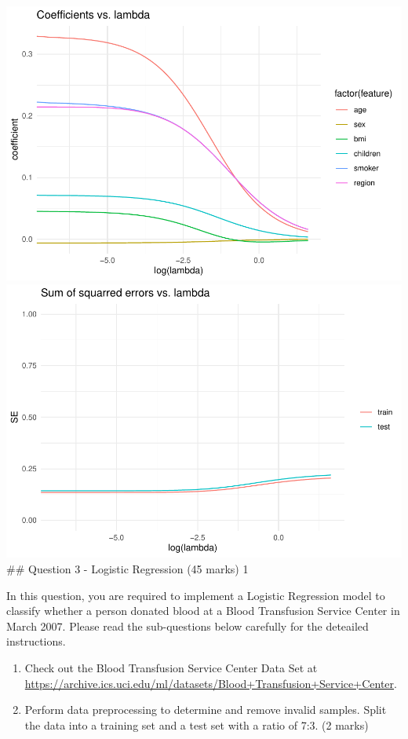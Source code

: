 \documentclass[
]{article}
\providecommand{\tightlist}{%
  \setlength{\itemsep}{0pt}\setlength{\parskip}{0pt}}
\begin{document}
\includegraphics{assessment-1_files/figure-latex/unnamed-chunk-18-3.pdf}
\includegraphics{assessment-1_files/figure-latex/unnamed-chunk-18-4.pdf}
\#\# Question 3 - Logistic Regression (45 marks) 1

In this question, you are required to implement a Logistic Regression
model to classify whether a person donated blood at a Blood Transfusion
Service Center in March 2007. Please read the sub-questions below
carefully for the deteailed instructions.

\begin{enumerate}
\def\labelenumi{\arabic{enumi}.}
\tightlist
\item
  Check out the Blood Transfusion Service Center Data Set at
  \url{https://archive.ics.uci.edu/ml/datasets/Blood+Transfusion+Service+Center}.
\item
  Perform data preprocessing to determine and remove invalid samples.
  Split the data into a training set and a test set with a ratio of 7:3.
  (2 marks)
\end{enumerate}
\end{document}
